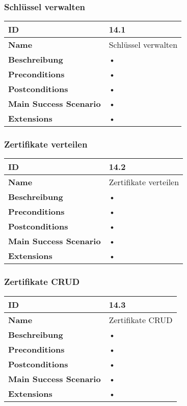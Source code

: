 \subsubsection{Schlüssel verwalten}
\mbox{}
\begin{longtable}{| p{4cm} | p{11.7cm} |}
 \hline
 \textbf{ID} & 14.1\\ \hline 
 \textbf{Name} & Schlüssel verwalten\\ \hline 
 \textbf{Beschreibung} & • \\ \hline 
 \textbf{Preconditions} & • \\ \hline 
 \textbf{Postconditions} & • \\ \hline 
 \textbf{Main Success Scenario} & • \\ \hline 
 \textbf{Extensions} & • \\ \hline 
 \end{longtable}
 
\subsubsection{Zertifikate verteilen}
\mbox{}
\begin{longtable}{| p{4cm} | p{11.7cm} |}
 \hline
 \textbf{ID} & 14.2\\ \hline 
 \textbf{Name} & Zertifikate verteilen\\ \hline 
 \textbf{Beschreibung} & • \\ \hline 
 \textbf{Preconditions} & • \\ \hline 
 \textbf{Postconditions} & • \\ \hline 
 \textbf{Main Success Scenario} & • \\ \hline 
 \textbf{Extensions} & • \\ \hline 
 \end{longtable}
 
\subsubsection{Zertifikate CRUD}
\mbox{}
\begin{longtable}{| p{4cm} | p{11.7cm} |}
 \hline
 \textbf{ID} & 14.3\\ \hline 
 \textbf{Name} & Zertifikate CRUD\\ \hline 
 \textbf{Beschreibung} & • \\ \hline 
 \textbf{Preconditions} & • \\ \hline 
 \textbf{Postconditions} & • \\ \hline 
 \textbf{Main Success Scenario} & • \\ \hline 
 \textbf{Extensions} & • \\ \hline 
 \end{longtable} 
 
